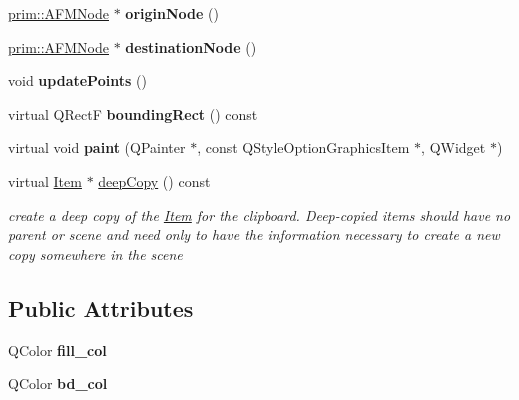 \begin{DoxyCompactItemize}
\item 
\hyperlink{classprim_1_1AFMNode}{prim\+::\+A\+F\+M\+Node} $\ast$ {\bfseries origin\+Node} ()\hypertarget{classprim_1_1AFMSeg_a647615aa90d42be45c83064e3b329914}{}\label{classprim_1_1AFMSeg_a647615aa90d42be45c83064e3b329914}

\item 
\hyperlink{classprim_1_1AFMNode}{prim\+::\+A\+F\+M\+Node} $\ast$ {\bfseries destination\+Node} ()\hypertarget{classprim_1_1AFMSeg_ac7ff719522f14a7abee70ed32ef36474}{}\label{classprim_1_1AFMSeg_ac7ff719522f14a7abee70ed32ef36474}

\item 
void {\bfseries update\+Points} ()\hypertarget{classprim_1_1AFMSeg_a250912876820d1df7ac8345a682e4171}{}\label{classprim_1_1AFMSeg_a250912876820d1df7ac8345a682e4171}

\item 
virtual Q\+RectF {\bfseries bounding\+Rect} () const \hypertarget{classprim_1_1AFMSeg_a460f307f1f4d7b43ce31595350ebc130}{}\label{classprim_1_1AFMSeg_a460f307f1f4d7b43ce31595350ebc130}

\item 
virtual void {\bfseries paint} (Q\+Painter $\ast$, const Q\+Style\+Option\+Graphics\+Item $\ast$, Q\+Widget $\ast$)\hypertarget{classprim_1_1AFMSeg_aa066c0e229182999b5fb6b40939c2039}{}\label{classprim_1_1AFMSeg_aa066c0e229182999b5fb6b40939c2039}

\item 
virtual \hyperlink{classprim_1_1Item}{Item} $\ast$ \hyperlink{classprim_1_1AFMSeg_aa233ac610fd6ae6aeac4815b6be0e757}{deep\+Copy} () const \hypertarget{classprim_1_1AFMSeg_aa233ac610fd6ae6aeac4815b6be0e757}{}\label{classprim_1_1AFMSeg_aa233ac610fd6ae6aeac4815b6be0e757}

\begin{DoxyCompactList}\small\item\em create a deep copy of the \hyperlink{classprim_1_1Item}{Item} for the clipboard. Deep-\/copied items should have no parent or scene and need only to have the information necessary to create a new copy somewhere in the scene \end{DoxyCompactList}\end{DoxyCompactItemize}
\subsection*{Public Attributes}
\begin{DoxyCompactItemize}
\item 
Q\+Color {\bfseries fill\+\_\+col}\hypertarget{classprim_1_1AFMSeg_a279edf9d4ab5c7e18180d83e66bf25ce}{}\label{classprim_1_1AFMSeg_a279edf9d4ab5c7e18180d83e66bf25ce}

\item 
Q\+Color {\bfseries bd\+\_\+col}\hypertarget{classprim_1_1AFMSeg_a10ec279ad0f724af70490a97d1ed46e7}{}\label{classprim_1_1AFMSeg_a10ec279ad0f724af70490a97d1ed46e7}

\end{DoxyCompactItemize}
